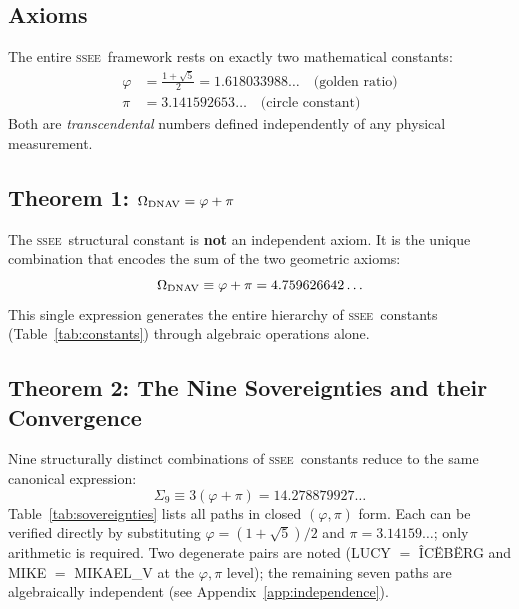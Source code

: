 \documentclass[12pt,a4paper]{article}
\newcommand{\SSEE}{\ifmmode\mathrm{SSEE}\else\textsc{ssee}\fi}
\begin{document}
\subsection{Axioms}

The entire \SSEE\ framework rests on exactly two mathematical constants:
\begin{align}
\varphi &= \frac{1+\sqrt{5}}{2} = 1.618033988\ldots
          \quad\text{(golden ratio)} \\
\pi     &= 3.141592653\ldots
          \quad\text{(circle constant)}
\end{align}
Both are \emph{transcendental} numbers defined independently of any physical
measurement.

\subsection{Theorem 1: \texorpdfstring{$\Omega_{\rm DNAV} = \varphi+\pi$}{Omega = phi+pi}}
\label{sec:omega}

The \SSEE\ structural constant is \textbf{not} an independent axiom.
It is the unique combination that encodes the sum of the two geometric axioms:
\begin{equation}
\Omega_{\rm DNAV} \equiv \varphi + \pi = 4.759626642\ldots
\label{eq:omega}
\end{equation}
This single expression generates the entire hierarchy of \SSEE\ constants
(Table~\ref{tab:constants}) through algebraic operations alone.

\subsection{Theorem 2: The Nine Sovereignties and their Convergence}
\label{sec:sovereigns}

Nine structurally distinct combinations of \SSEE\ constants reduce to
the same canonical expression:
\begin{equation}
\Sigma_9 \equiv 3(\varphi+\pi) = 14.278879927\ldots
\label{eq:sigma9}
\end{equation}
Table~\ref{tab:sovereignties} lists all paths in closed $(\varphi,\pi)$ form.
Each can be verified directly by substituting $\varphi=(1+\sqrt{5})/2$
and $\pi=3.14159\ldots$; only arithmetic is required.
Two degenerate pairs are noted (LUCY $=$ \^{I}C\"{E}B\"{E}RG and
MIKE $=$ MIKAEL\_V at the $\varphi,\pi$ level); the remaining seven paths are
algebraically independent (see Appendix~\ref{app:independence}).
\end{document}
